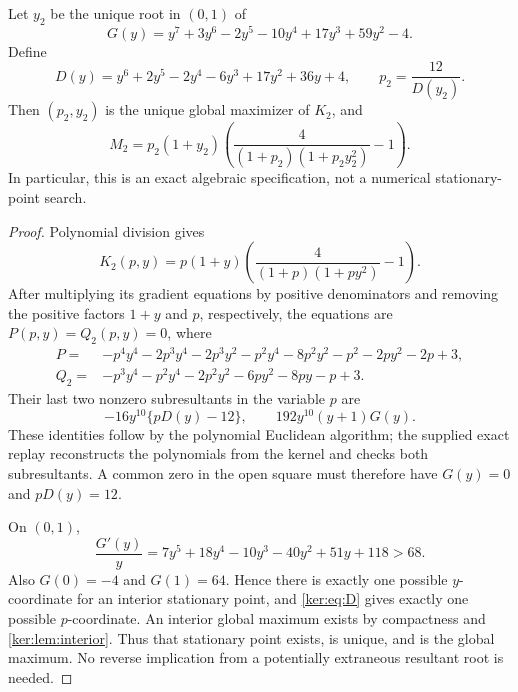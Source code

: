 \begin{theorem}\label{ker:thm:N2}
Let $y_2$ be the unique root in $(0,1)$ of
\begin{equation}\label{ker:eq:G}
 G(y)=y^7+3y^6-2y^5-10y^4+17y^3+59y^2-4.
\end{equation}
Define
\begin{equation}\label{ker:eq:D}
 D(y)=y^6+2y^5-2y^4-6y^3+17y^2+36y+4,
 \qquad p_2=\frac{12}{D(y_2)}.
\end{equation}
Then $(p_2,y_2)$ is the unique global maximizer of $K_2$, and
\begin{equation}\label{ker:eq:M2}
 M_2=p_2(1+y_2)
       \left(\frac4{(1+p_2)(1+p_2y_2^2)}-1\right).
\end{equation}
In particular, this is an exact algebraic specification, not a
numerical stationary-point search.
\end{theorem}
\begin{proof}
Polynomial division gives
\[
 K_2(p,y)=p(1+y)
       \left(\frac4{(1+p)(1+py^2)}-1\right).
\]
After multiplying its gradient equations by positive denominators and
removing the positive factors $1+y$ and $p$, respectively, the equations
are $P(p,y)=Q_2(p,y)=0$, where
\begin{align*}
 P={}&-p^4y^4-2p^3y^4-2p^3y^2-p^2y^4-8p^2y^2-p^2
                       -2py^2-2p+3,\\
 Q_2={}&-p^3y^4-p^2y^4-2p^2y^2-6py^2-8py-p+3.
\end{align*}
Their last two nonzero subresultants in the variable $p$ are
\begin{equation}\label{ker:eq:subresultants}
 -16y^{10}\{pD(y)-12\},\qquad 192y^{10}(y+1)G(y).
\end{equation}
These identities follow by the polynomial Euclidean algorithm; the
supplied exact replay reconstructs the polynomials from the kernel and
checks both subresultants. A common zero in the open square must
therefore have $G(y)=0$ and $pD(y)=12$.

On $(0,1)$,
\[
 \frac{G'(y)}y=7y^5+18y^4-10y^3-40y^2+51y+118>68.
\]
Also $G(0)=-4$ and $G(1)=64$. Hence there is exactly one possible
$y$-coordinate for an interior stationary point, and
\eqref{ker:eq:D} gives exactly one possible $p$-coordinate.
An interior global maximum exists by compactness and
\cref{ker:lem:interior}. Thus that stationary point exists, is unique,
and is the global maximum. No reverse implication from a potentially
extraneous resultant root is needed.
\end{proof}


